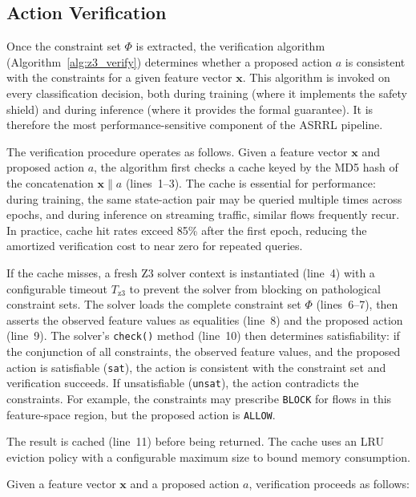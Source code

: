 \documentclass[12pt, letterpaper, oneside]{report}
\newcommand{\ASRRL}{\textsc{ASRRL}}
\newcommand{\bx}{\mathbf{x}}
\begin{document}
\subsection{Action Verification}
\label{sec:z3_verify}

Once the constraint set $\Phi$ is extracted, the verification algorithm (Algorithm~\ref{alg:z3_verify}) determines whether a proposed action $a$ is consistent with the constraints for a given feature vector $\bx$. This algorithm is invoked on every classification decision, both during training (where it implements the safety shield) and during inference (where it provides the formal guarantee). It is therefore the most performance-sensitive component of the \ASRRL{} pipeline.

The verification procedure operates as follows. Given a feature vector $\bx$ and proposed action $a$, the algorithm first checks a cache keyed by the MD5 hash of the concatenation $\bx \| a$ (lines~1--3). The cache is essential for performance: during training, the same state-action pair may be queried multiple times across epochs, and during inference on streaming traffic, similar flows frequently recur. In practice, cache hit rates exceed 85\% after the first epoch, reducing the amortized verification cost to near zero for repeated queries.

If the cache misses, a fresh Z3 solver context is instantiated (line~4) with a configurable timeout $T_{\text{z3}}$ to prevent the solver from blocking on pathological constraint sets. The solver loads the complete constraint set $\Phi$ (lines~6--7), then asserts the observed feature values as equalities (line~8) and the proposed action (line~9). The solver's \texttt{check()} method (line~10) then determines satisfiability: if the conjunction of all constraints, the observed feature values, and the proposed action is satisfiable (\texttt{sat}), the action is consistent with the constraint set and verification succeeds. If unsatisfiable (\texttt{unsat}), the action contradicts the constraints. For example, the constraints may prescribe \texttt{BLOCK} for flows in this feature-space region, but the proposed action is \texttt{ALLOW}.

The result is cached (line~11) before being returned. The cache uses an LRU eviction policy with a configurable maximum size to bound memory consumption.

Given a feature vector $\bx$ and a proposed action $a$, verification proceeds as follows:
\end{document}
